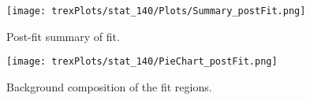 \begin{figure}[h!]
    \center
    \texttt{[image: trexPlots/stat\_140/Plots/Summary\_postFit.png]}
    \caption{Post-fit summary of fit.}
    \label{fig:Summary140}
\end{figure}

\begin{figure}[H]
    \centering                                                                                                               
    \texttt{[image: trexPlots/stat\_140/PieChart\_postFit.png]}
    \caption{Background composition of the fit regions.}
    \label{fig:pieChart140}
\end{figure}

